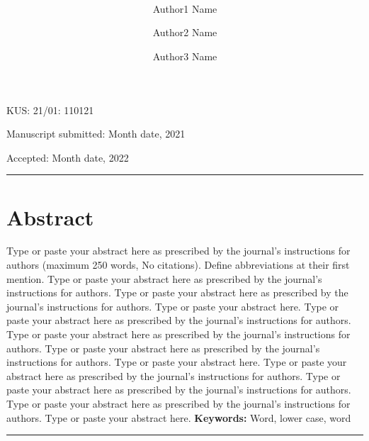\documentclass[12pt,a4paper,twoside]{article}
\title{%
\centering\normalsize  
\vspace{-0.7in}
\colorbox{black}{\parbox{\linewidth}{\textcolor{white}{\hfill\KUS \hfill}}} \\[0.5ex]
\begin{minipage}{\dimexpr0.32\textwidth}\raggedright\oriart\end{minipage}
\begin{minipage}{\dimexpr0.32\textwidth}\centering\LOGO \end{minipage}%
\begin{minipage}{\dimexpr0.32\textwidth}\raggedleft\schlname\end{minipage}\\[0.5ex]
\colorbox{black}{\parbox{\linewidth}{\textcolor{white}{\hfill\KUni\hfill}}}\\[1ex]
\titleofArt
}
\author[1]{Author1 Name}
\author[2]{Author2 Name}
\author[1]{Author3 Name}
\affil[1]{Department, University, City with postal code, Country}
\affil[2]{Department, University, City with postal code, Country}
\date{}
\begin{document}
\maketitle 
\vspace{-23pt}
\begin{minipage}{\textwidth}\centering KUS: 21/01: 110121 \end{minipage}
\begin{minipage}{\dimexpr0.5\textwidth}\raggedright Manuscript submitted: Month date, 2021 \end{minipage}%
\begin{minipage}{\dimexpr0.5\textwidth}\raggedleft Accepted: Month date, 2022\end{minipage}
\vspace{-20pt}
\thispagestyle{Initial}

\noindent
\rule{\textwidth}{0.4pt}
\section*{Abstract}
Type or paste your abstract here as prescribed by the journal’s instructions for authors (maximum 250 words, No citations). Define abbreviations at their first mention. Type or paste your abstract here as prescribed by the journal’s instructions for authors. Type or paste your abstract here as prescribed by the journal’s instructions for authors. Type or paste your abstract here. Type or paste your abstract here as prescribed by the journal’s instructions for authors. Type or paste your abstract here as prescribed by the journal’s instructions for authors. Type or paste your abstract here as prescribed by the journal’s instructions for authors. Type or paste your abstract here. Type or paste your abstract here as prescribed by the journal’s instructions for authors. Type or paste your abstract here as prescribed by the journal’s instructions for authors. Type or paste your abstract here as prescribed by the journal’s instructions for authors. Type or paste your abstract here.
\hfill \break
\hfill \break
\textbf{Keywords:} Word, lower case, word
\hfill \break
\noindent
\rule{\textwidth}{0.4pt}
\end{document}
